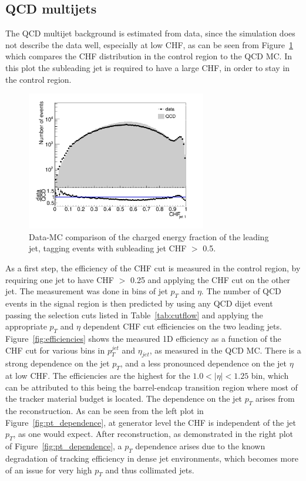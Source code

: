 \subsection{QCD multijets}

The \acs{QCD} multijet background is estimated from data, since the simulation does not describe the data well, especially at low CHF, as can be seen from Figure~\ref{fig:dataMC} which compares the CHF distribution in the control region to the \acs{QCD} MC. In this plot the subleading jet is required to have a large CHF, in order to stay in the control region.

\begin{figure}[ht]
  \centering
  \includegraphics[width=0.7\textwidth]{figures/bkgd_estimation_dataMC.pdf}\hfill%
  \caption{Data-MC comparison of the charged energy fraction of the leading jet, tagging events with subleading jet CHF $>$ 0.5.}
  \label{fig:dataMC}
\end{figure}

As a first step, the efficiency of the CHF cut is measured in the control region, by requiring one jet to have CHF $>$ 0.25 and applying the CHF cut on the other jet. The measurement was done in bins of jet $p_T$ and $\eta$. The number of \acs{QCD} events in the signal region is then predicted by using any \acs{QCD} dijet event passing the selection cuts listed in Table~\ref{tab:cutflow} and applying the appropriate $p_T$ and $\eta$ dependent CHF cut efficiencies on the two leading jets. Figure~\ref{fig:efficiencies} shows the measured 1D efficiency as a function of the CHF cut for various bins in $p_T^{jet}$ and $\eta_{jet}$, as measured in the \ac{QCD} MC. There is a strong dependence on the jet $p_T$, and a less pronounced dependence on the jet $\eta$ at low CHF. The efficiencies are the highest for the $1.0 < |\eta| < 1.25$ bin, which can be attributed to this being the barrel-endcap transition region where most of the tracker material budget is located. The dependence on the jet $p_T$ arises from the reconstruction. As can be seen from the left plot in Figure~\ref{fig:pt_dependence}, at generator level the CHF is independent of the jet $p_T$, as one would expect. After reconstruction, as demonstrated in the right plot of Figure~\ref{fig:pt_dependence}, a $p_T$ dependence arises due to the known degradation of tracking efficiency in dense jet environments, which becomes more of an issue for very high $p_T$ and thus collimated jets.

